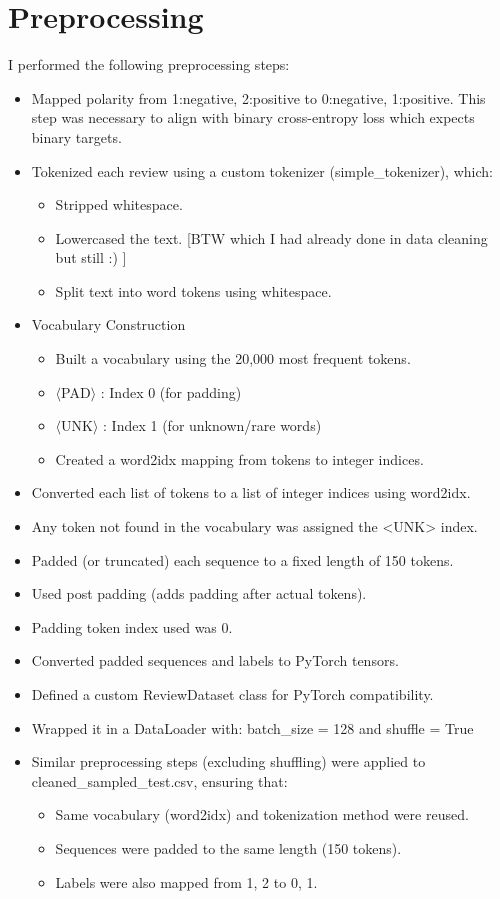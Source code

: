 \documentclass[12pt]{article}
\begin{document}
\section{Preprocessing}
I performed the following preprocessing steps:

\begin{itemize}
    \item Mapped polarity from 1:negative, 2:positive to 0:negative, 1:positive. This step was necessary to align with binary cross-entropy loss which expects binary targets.
    \item Tokenized each review using a custom tokenizer (simple\_tokenizer), which:
    \begin{itemize}
        \item Stripped whitespace.
        \item Lowercased the text. [BTW which I had already done in data cleaning but still :) ]
        \item Split text into word tokens using whitespace.
    \end{itemize}
    \item Vocabulary Construction
    \begin{itemize}
        \item Built a vocabulary using the 20,000 most frequent tokens.
        \item $\langle$PAD$\rangle$ : Index 0 (for padding)
        \item $\langle$UNK$\rangle$ : Index 1 (for unknown/rare words)
        \item Created a word2idx mapping from tokens to integer indices.
    \end{itemize}
    \item Converted each list of tokens to a list of integer indices using word2idx.
    \item Any token not found in the vocabulary was assigned the <UNK> index.
    \item Padded (or truncated) each sequence to a fixed length of 150 tokens.
    \item Used post padding (adds padding after actual tokens).
    \item Padding token index used was 0.
    \item Converted padded sequences and labels to PyTorch tensors.
    \item Defined a custom ReviewDataset class for PyTorch compatibility.
    \item Wrapped it in a DataLoader with: batch\_size = 128 and shuffle = True
    \item Similar preprocessing steps (excluding shuffling) were applied to cleaned\_sampled\_test.csv, ensuring that:
    \begin{itemize}
        \item Same vocabulary (word2idx) and tokenization method were reused.
        \item Sequences were padded to the same length (150 tokens).
        \item Labels were also mapped from {1, 2} to {0, 1}.
    \end{itemize}
\end{itemize}
\end{document}
